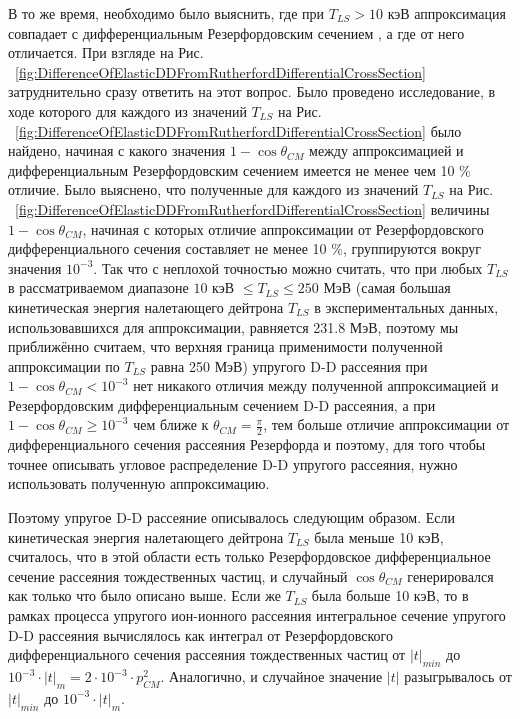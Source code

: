 \documentclass[a4paper,12pt]{article}
\begin{document}
\begin{large}
	В то же время, необходимо было выяснить, где при $T_{LS}>10$ кэВ аппроксимация совпадает с дифференциальным Резерфордовским сечением , а где от него отличается. 
	При взгляде на Рис. ~\ref{fig:DifferenceOfElasticDDFromRutherfordDifferentialCrossSection} затруднительно сразу ответить на этот вопрос. 
	Было проведено исследование, в ходе которого для каждого из значений $T_{LS}$ на Рис. ~\ref{fig:DifferenceOfElasticDDFromRutherfordDifferentialCrossSection} было найдено, начиная с какого значения $1-\cos{ \theta_{CM} }$ между аппроксимацией и дифференциальным Резерфордовским сечением имеется не менее чем 10 \% отличие. 
	Было выяснено, что полученные для каждого из значений $T_{LS}$ на Рис. ~\ref{fig:DifferenceOfElasticDDFromRutherfordDifferentialCrossSection} величины $1-\cos{ \theta_{CM} }$, начиная с которых отличие аппроксимации от Резерфордовского дифференциального сечения составляет не менее 10 \%, группируются вокруг значения $10^{-3}$. 
	Так что с неплохой точностью можно считать, что при любых $T_{LS}$ в рассматриваемом диапазоне $10$ кэВ $\leq T_{LS} \leq 250$ МэВ (самая большая кинетическая энергия налетающего дейтрона $T_{LS}$ в экспериментальных данных, использовавшихся  для аппроксимации, равняется 231.8 МэВ, поэтому мы приближённо считаем, что верхняя граница применимости полученной аппроксимации по $T_{LS}$ равна 250 МэВ) упругого D-D рассеяния при $1-\cos{ \theta_{CM}} < 10^{-3}$ нет никакого отличия между полученной аппроксимацией и Резерфордовским дифференциальным сечением D-D рассеяния, а при $1-\cos{ \theta_{CM}} \geq 10^{-3}$ чем ближе к $\theta_{CM}=\frac{\pi}{2}$, тем больше отличие аппроксимации от дифференциального сечения рассеяния Резерфорда и поэтому, для того чтобы точнее описывать угловое распределение D-D упругого рассеяния, нужно использовать полученную аппроксимацию.
	
	Поэтому упругое D-D рассеяние описывалось следующим образом.
	Если кинетическая энергия налетающего дейтрона $T_{LS}$ была меньше 10 кэВ, считалось, что в этой области есть только Резерфордовское дифференциальное сечение рассеяния тождественных частиц, и случайный $\cos{\theta_{CM}}$ генерировался как только что было описано выше.
	Если же $T_{LS}$ была больше 10 кэВ, то в рамках процесса упругого ион-ионного рассеяния интегральное сечение упругого D-D рассеяния вычислялось как интеграл от Резерфордовского дифференциального сечения рассеяния тождественных частиц от $|t|_{min}$ до $10^{-3}\cdot |t|_{m}=2\cdot 10^{-3}\cdot p^2_{CM}$.
	Аналогично, и случайное значение $|t|$ разыгрывалось от $|t|_{min}$ до $10^{-3}\cdot |t|_m$.
	

\end{large}
\end{document}
